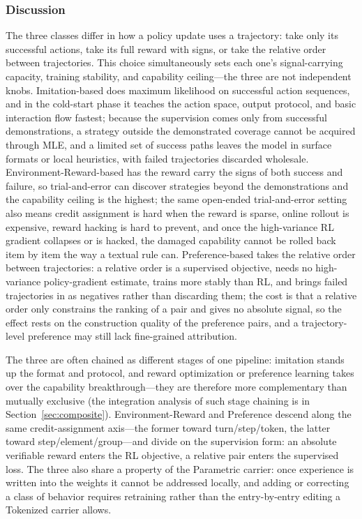 \subsubsection{Discussion}

The three classes differ in how a policy update uses a trajectory: take only its successful actions, take its full reward with signs, or take the relative order between trajectories. This choice simultaneously sets each one's signal-carrying capacity, training stability, and capability ceiling---the three are not independent knobs. Imitation-based does maximum likelihood on successful action sequences, and in the cold-start phase it teaches the action space, output protocol, and basic interaction flow fastest; because the supervision comes only from successful demonstrations, a strategy outside the demonstrated coverage cannot be acquired through MLE, and a limited set of success paths leaves the model in surface formats or local heuristics, with failed trajectories discarded wholesale. Environment-Reward-based has the reward carry the signs of both success and failure, so trial-and-error can discover strategies beyond the demonstrations and the capability ceiling is the highest; the same open-ended trial-and-error setting also means credit assignment is hard when the reward is sparse, online rollout is expensive, reward hacking is hard to prevent, and once the high-variance RL gradient collapses or is hacked, the damaged capability cannot be rolled back item by item the way a textual rule can. Preference-based takes the relative order between trajectories: a relative order is a supervised objective, needs no high-variance policy-gradient estimate, trains more stably than RL, and brings failed trajectories in as negatives rather than discarding them; the cost is that a relative order only constrains the ranking of a pair and gives no absolute signal, so the effect rests on the construction quality of the preference pairs, and a trajectory-level preference may still lack fine-grained attribution.

The three are often chained as different stages of one pipeline: imitation stands up the format and protocol, and reward optimization or preference learning takes over the capability breakthrough---they are therefore more complementary than mutually exclusive (the integration analysis of such stage chaining is in Section~\ref{sec:composite}). Environment-Reward and Preference descend along the same credit-assignment axis---the former toward turn/step/token, the latter toward step/element/group---and divide on the supervision form: an absolute verifiable reward enters the RL objective, a relative pair enters the supervised loss. The three also share a property of the Parametric carrier: once experience is written into the weights it cannot be addressed locally, and adding or correcting a class of behavior requires retraining rather than the entry-by-entry editing a Tokenized carrier allows.
